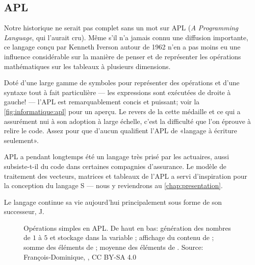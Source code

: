 \subsection{APL}
\label{sec:informatique:historique:apl}

Notre historique ne serait pas complet sans un mot sur APL
(\emph{A Programming Language}, qui l'aurait cru). Même s'il n'a
jamais connu une diffusion importante, ce langage conçu par Kenneth
Iverson autour de 1962 n'en a pas moins eu une influence considérable
sur la manière de penser et de représenter les opérations
mathématiques sur les tableaux à plusieurs dimensions.

Doté d'une large gamme de symboles pour représenter des opérations et
d'une syntaxe tout à fait particulière --- les expressions sont
exécutées de droite à gauche! --- l'APL est remarquablement concis et
puissant; voir la \autoref{fig:informatique:apl} pour un aperçu. Le
revers de la cette médaille et ce qui a assurément nui à son adoption
à large échelle, c'est la difficulté que l'on éprouve à relire le
code. Assez pour que d'aucun qualifient l'APL de «langage à écriture
seulement».

APL a pendant longtemps été un langage très prisé par les actuaires,
aussi subsiste-t-il du code dans certaines compagnies d'assurance. Le
modèle de traitement des vecteurs, matrices et tableaux de l'APL a
servi d'inspiration pour la conception du langage S --- nous y
reviendrons au \autoref{chap:presentation}.

Le langage continue sa vie aujourd'hui principalement sous forme de son
successeur, J.

\begin{figure}
  \centering
  \caption[Opérations simples en APL.]{Opérations simples en APL. De
    haut en bas: génération des nombres de $1$ à $5$ et stockage dans
    la variable ; affichage du contenu de ; somme des
    éléments de ; moyenne des éléments de . {\small Source:
    François-Dominique,
    , CC BY-SA 4.0}}
  \label{fig:informatique:apl}
\end{figure}

